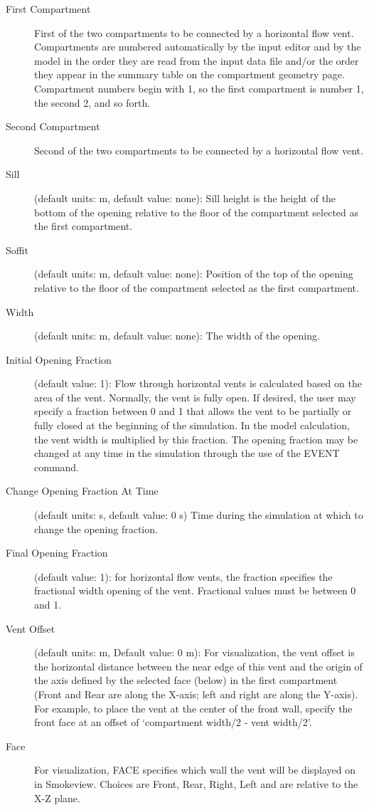 \begin{description}
\item[First Compartment] First of the two compartments to be connected by a horizontal flow vent.  Compartments are numbered automatically by the input editor and by the model in the order they are read from the input data file and/or the order they appear in the summary table on the compartment geometry page. Compartment numbers begin with 1, so the first compartment is number 1, the second 2, and so forth.

\item[Second Compartment] Second of the two compartments to be connected by a horizontal flow vent.  

\item[Sill] (default units: m, default value: none): Sill height is the height of the bottom of the opening relative to the floor of the compartment selected as the first compartment.

\item[Soffit] (default units: m, default value: none): Position of the top of the opening relative to the floor of the compartment selected as the first compartment.

\item[Width] (default units: m, default value: none): The width of the opening.

\item[Initial Opening Fraction] (default value: 1): Flow through horizontal vents is calculated based on the area of the vent.  Normally, the vent is fully open.  If desired, the user may specify a fraction between 0 and 1 that allows the vent to be partially or fully closed at the beginning of the simulation.  In the model calculation, the vent width is multiplied by this fraction.  The opening fraction may be changed at any time in the simulation through the use of the EVENT command.

\item[Change Opening Fraction At Time]  (default units: s, default value: 0 s)  Time during the simulation at which to change the opening fraction.

\item[Final Opening Fraction] (default value: 1): for horizontal flow vents, the fraction specifies the fractional width opening of the vent. Fractional values must be between 0 and 1.

\item[Vent Offset] (default units: m, Default value: 0 m): For visualization, the vent offset is the horizontal distance between the near edge of this vent and the origin of the axis defined by the selected face (below) in the first compartment (Front and Rear are along the X-axis; left and right are along the Y-axis). For example, to place the vent at the center of the front wall, specify the front face at an offset of `compartment width/2 - vent width/2'.

\item[Face] For visualization, FACE specifies which wall the vent will be displayed on in Smokeview.  Choices are Front, Rear, Right, Left and are relative to the X-Z plane.
\end{description}

